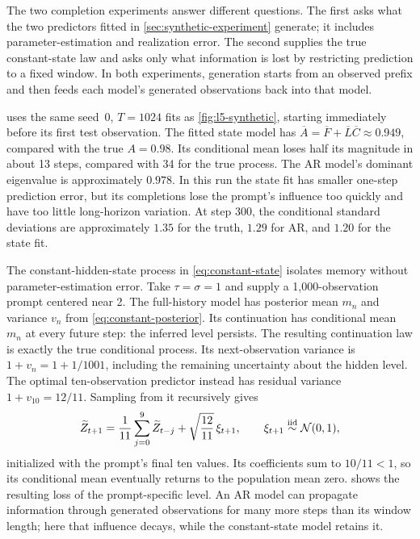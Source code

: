 \documentclass[11pt,twoside]{article}
\theoremstyle{definition}
\theoremstyle{remark}
\begin{document}
The two completion experiments answer different questions. The first asks
what the two predictors fitted in \cref{sec:synthetic-experiment} generate;
it includes parameter-estimation and realization error. The second supplies
the true constant-state law and asks only what information is lost by
restricting prediction to a fixed window. In both experiments, generation
starts from an observed prefix and then feeds each model's generated
observations back into that model.

 uses the same seed~0, \(T=1024\) fits as
\cref{fig:l5-synthetic}, starting immediately before its first test
observation. The fitted state model has
\(\overline A=\overline F+\overline L\overline C\approx0.949\), compared
with the true \(A=0.98\). Its conditional mean loses half its magnitude
in about 13 steps, compared with 34 for the true process. The AR model's
dominant eigenvalue is approximately \(0.978\).
In this run the state fit has smaller one-step prediction error, but
its completions lose the prompt's influence too quickly and have too
little long-horizon variation. At step 300, the conditional standard
deviations are approximately \(1.35\) for the truth, \(1.29\) for AR,
and \(1.20\) for the state fit.



The constant-hidden-state process in \cref{eq:constant-state} isolates
memory without parameter-estimation error. Take \(\tau=\sigma=1\)
and supply a 1,000-observation prompt centered near 2.
The full-history model has posterior mean \(m_n\) and variance \(v_n\)
from \cref{eq:constant-posterior}. Its continuation has conditional
mean \(m_n\) at every future step: the inferred level persists.
The resulting continuation law is exactly the true conditional process. Its next-observation
variance is \(1+v_n=1+1/1001\), including the remaining uncertainty
about the hidden level. The optimal ten-observation predictor instead
has residual variance \(1+v_{10}=12/11\). Sampling from it recursively gives
\[
 \widetilde Z_{t+1}
 =\frac1{11}\sum_{j=0}^{9}\widetilde Z_{t-j}
   +\sqrt{\frac{12}{11}}\,\xi_{t+1},
 \qquad \xi_{t+1}\stackrel{\rm iid}{\sim}\mathcal N(0,1),
\]
initialized with the prompt's final ten values.
Its coefficients sum to \(10/11<1\), so its conditional mean eventually
returns to the population mean zero.
 shows the resulting loss of the
prompt-specific level. An AR model can propagate information through
generated observations for many more steps than its window length;
here that influence decays, while the constant-state model retains it.
\end{document}
